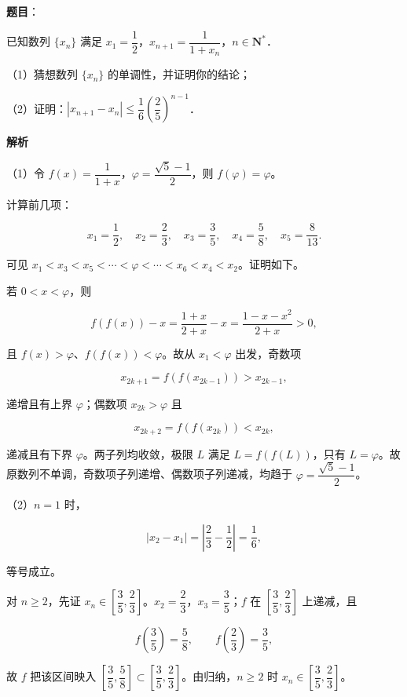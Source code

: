 \begin{answer}

\textbf{题目}：

已知数列 $\{x_n\}$ 满足 $x_1=\dfrac12$，$x_{n+1}=\dfrac1{1+x_n}$，$n\in\mathbf N^*$．

（1）猜想数列 $\{x_n\}$ 的单调性，并证明你的结论；

（2）证明：$|x_{n+1}-x_n|\leqslant\dfrac16\left(\dfrac25\right)^{n-1}$．

\textbf{解析}

（1）令 $f(x)=\dfrac1{1+x}$，$\varphi=\dfrac{\sqrt5-1}2$，则 $f(\varphi)=\varphi$。

计算前几项：

\nopagebreak[4]
\[x_1=\frac12,\quad x_2=\frac23,\quad x_3=\frac35,\quad x_4=\frac58,\quad x_5=\frac8{13}.\]

可见 $x_1<x_3<x_5<\cdots<\varphi<\cdots<x_6<x_4<x_2$。证明如下。

若 $0<x<\varphi$，则

\nopagebreak[4]
\[f(f(x))-x=\frac{1+x}{2+x}-x=\frac{1-x-x^2}{2+x}>0,\]

且 $f(x)>\varphi$、$f(f(x))<\varphi$。故从 $x_1<\varphi$ 出发，奇数项

\nopagebreak[4]
\[x_{2k+1}=f(f(x_{2k-1}))>x_{2k-1},\]

递增且有上界 $\varphi$；偶数项 $x_{2k}> \varphi$ 且

\nopagebreak[4]
\[x_{2k+2}=f(f(x_{2k}))<x_{2k},\]

递减且有下界 $\varphi$。两子列均收敛，极限 $L$ 满足 $L=f(f(L))$，只有 $L=\varphi$。故原数列不单调，奇数项子列递增、偶数项子列递减，均趋于 $\varphi=\dfrac{\sqrt5-1}2$。

（2）$n=1$ 时，

\nopagebreak[4]
\[|x_2-x_1|=\left|\frac23-\frac12\right|=\frac16,\]

等号成立。

对 $n\geqslant2$，先证 $x_n\in\left[\dfrac35,\dfrac23\right]$。$x_2=\dfrac23$，$x_3=\dfrac35$；$f$ 在 $\left[\dfrac35,\dfrac23\right]$ 上递减，且

\nopagebreak[4]
\[f\left(\frac35\right)=\frac58,\qquad f\left(\frac23\right)=\frac35,\]

故 $f$ 把该区间映入 $\left[\dfrac35,\dfrac58\right]\subset\left[\dfrac35,\dfrac23\right]$。由归纳，$n\geqslant2$ 时 $x_n\in\left[\dfrac35,\dfrac23\right]$。


\end{answer}
